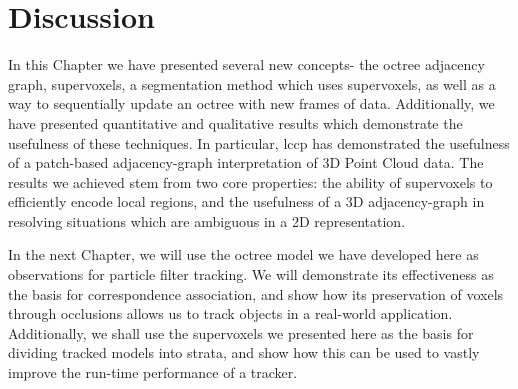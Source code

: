 \section{Discussion}

In this Chapter we have presented several new concepts- the octree adjacency graph, supervoxels, a segmentation method which uses supervoxels, as well as a way to sequentially update an octree with new frames of data. Additionally, we have presented quantitative and qualitative results which demonstrate the usefulness of these techniques. In particular, \gls{lccp} has demonstrated the usefulness of a patch-based adjacency-graph interpretation of 3D Point Cloud data. The results we achieved stem from two core properties: the ability of supervoxels to efficiently encode local regions, and the usefulness of a 3D adjacency-graph in resolving situations which are ambiguous in a 2D representation.

In the next Chapter, we will use the octree model we have developed here as observations for particle filter tracking. We will demonstrate its effectiveness as the basis for correspondence association, and show how its preservation of voxels through occlusions allows us to track objects in a real-world application. Additionally, we shall use the supervoxels we presented here as the basis for dividing tracked models into strata, and show how this can be used to vastly improve the run-time performance of a tracker. 

